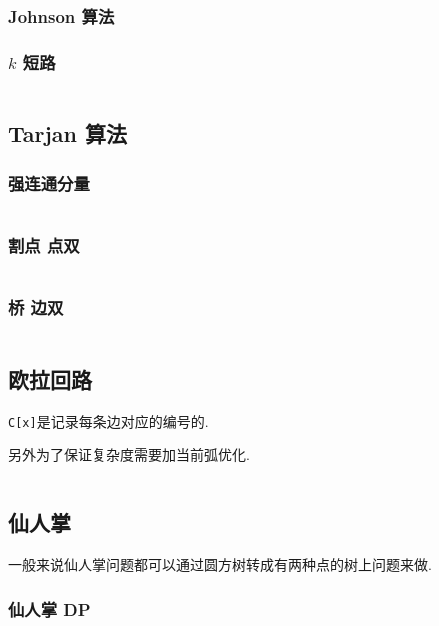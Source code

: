 \documentclass[a4paper, twoside]{article}
\begin{document}
\begin{multicols}{2}
				\subsubsection[Johnson 算法(负权图多源最短路)]{Johnson 算法}
					
				


				\subsubsection{$k$ 短路}
					\label{kshortestpath}
					\inputminted{cpp}{../src/graph/k短路.cpp}
			
			\subsection{Tarjan 算法}
				\subsubsection{强连通分量}
					\inputminted{cpp}{../src/graph/强连通分量.cpp}
				
				\subsubsection{割点 点双}
					\inputminted{cpp}{../src/graph/割点点双.cpp}

				\subsubsection{桥 边双}
					\inputminted{cpp}{../src/graph/边双.cpp}
			
			\subsection{欧拉回路}
				\texttt{C[x]}是记录每条边对应的编号的.
				
				另外为了保证复杂度需要加当前弧优化.
				
				\inputminted{cpp}{../src/graph/欧拉回路.cpp}

			\subsection{仙人掌}
				一般来说仙人掌问题都可以通过圆方树转成有两种点的树上问题来做.
				\subsubsection{仙人掌 DP}
					\inputminted{cpp}{../src/graph/仙人掌DP.cpp}
			

\end{multicols}
\end{document}
